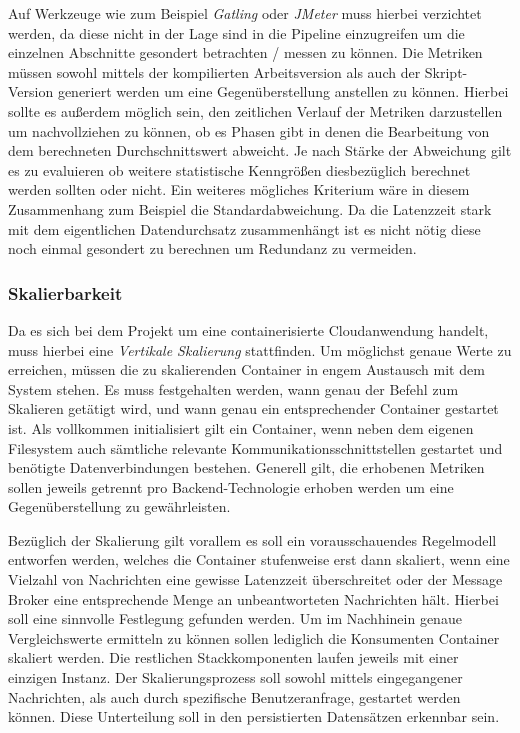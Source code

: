 Auf Werkzeuge wie zum Beispiel \emph{Gatling} oder \emph{JMeter} muss hierbei verzichtet werden, da diese nicht in der Lage sind in die Pipeline einzugreifen um die einzelnen Abschnitte gesondert betrachten / messen zu können. Die Metriken müssen sowohl mittels der kompilierten Arbeitsversion als auch der Skript-Version generiert werden um eine Gegenüberstellung anstellen zu können. Hierbei sollte es außerdem möglich sein, den zeitlichen Verlauf der Metriken darzustellen um nachvollziehen zu können, ob es Phasen gibt in denen die Bearbeitung von dem berechneten Durchschnittswert abweicht. Je nach Stärke der Abweichung gilt es zu evaluieren ob weitere statistische Kenngrößen diesbezüglich berechnet werden sollten oder nicht. Ein weiteres mögliches Kriterium wäre in diesem Zusammenhang zum Beispiel die Standardabweichung. Da die Latenzzeit stark mit dem eigentlichen Datendurchsatz zusammenhängt ist es nicht nötig diese noch einmal gesondert zu berechnen um Redundanz zu vermeiden.


\subsubsection{Skalierbarkeit}
Da es sich bei dem Projekt um eine containerisierte Cloudanwendung handelt, muss hierbei eine \emph{Vertikale Skalierung} stattfinden. Um möglichst genaue Werte zu erreichen, müssen die zu skalierenden Container in engem Austausch mit dem System stehen. Es muss festgehalten werden, wann genau der Befehl zum Skalieren getätigt wird, und wann genau ein entsprechender Container gestartet ist. Als vollkommen initialisiert gilt ein Container, wenn neben dem eigenen Filesystem auch sämtliche relevante Kommunikationsschnittstellen gestartet und benötigte Datenverbindungen bestehen. Generell gilt, die erhobenen Metriken sollen jeweils getrennt pro Backend-Technologie erhoben werden um eine Gegenüberstellung zu gewährleisten.

Bezüglich der Skalierung gilt vorallem es soll ein vorausschauendes Regelmodell entworfen werden, welches die Container stufenweise erst dann skaliert, wenn eine Vielzahl von Nachrichten eine gewisse Latenzzeit überschreitet oder der Message Broker eine entsprechende Menge an unbeantworteten Nachrichten hält. Hierbei soll eine sinnvolle Festlegung gefunden werden. Um im Nachhinein genaue Vergleichswerte ermitteln zu können sollen lediglich die Konsumenten Container skaliert werden. Die restlichen Stackkomponenten laufen jeweils mit einer einzigen Instanz. Der Skalierungsprozess soll sowohl mittels eingegangener Nachrichten, als auch durch spezifische Benutzeranfrage, gestartet werden können. Diese Unterteilung soll in den persistierten Datensätzen erkennbar sein.


